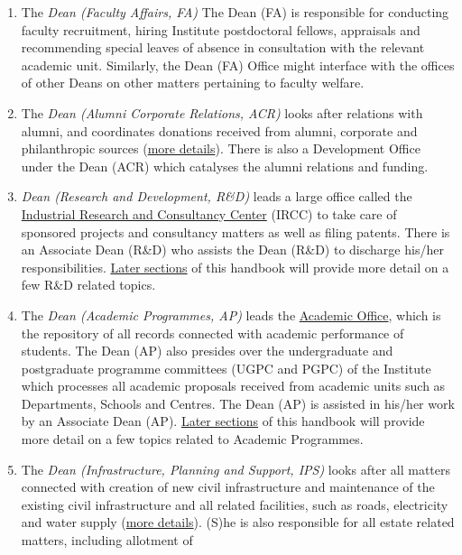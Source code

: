 \documentclass[
  10pt,
  a5paper,
  10pt,
  openany]{amsbook}
\begin{document}
\begin{enumerate}
\def\labelenumi{\arabic{enumi}.}
\item
  The \emph{Dean (Faculty Affairs, FA)} The Dean (FA) is responsible for
  conducting faculty recruitment, hiring Institute postdoctoral fellows,
  appraisals and recommending special leaves of absence in consultation
  with the relevant academic unit. Similarly, the Dean (FA) Office might
  interface with the offices of other Deans on other matters pertaining
  to faculty welfare.
\item
  The \emph{Dean (Alumni Corporate Relations, ACR)} looks after
  relations with alumni, and coordinates donations received from alumni,
  corporate and philanthropic sources
  (\href{https://acr.iitbombay.org/}{more details}). There is also a
  Development Office under the Dean (ACR) which catalyses the alumni
  relations and funding.
\item
  \emph{Dean (Research and Development, R\&D)} leads a large office
  called the \href{https://www.ircc.iitb.ac.in/}{Industrial Research and
  Consultancy Center} (IRCC) to take care of sponsored projects and
  consultancy matters as well as filing patents. There is an Associate
  Dean (R\&D) who assists the Dean (R\&D) to discharge his/her
  responsibilities. \hyperref[sec:researchfunding]{Later sections} of
  this handbook will provide more detail on a few R\&D related topics.
\item
  The \emph{Dean (Academic Programmes, AP)} leads the
  \href{http://www.iitb.ac.in/newacadhome/offdetail.jsp}{Academic
  Office}, which is the repository of all records connected with
  academic performance of students. The Dean (AP) also presides over the
  undergraduate and postgraduate programme committees (UGPC and PGPC) of
  the Institute which processes all academic proposals received from
  academic units such as Departments, Schools and Centres. The Dean (AP)
  is assisted in his/her work by an Associate Dean (AP).
  \hyperref[sec:acadrules]{Later sections} of this handbook will provide
  more detail on a few topics related to Academic Programmes.
\item
  The \emph{Dean (Infrastructure, Planning and Support, IPS)} looks
  after all matters connected with creation of new civil infrastructure
  and maintenance of the existing civil infrastructure and all related
  facilities, such as roads, electricity and water supply
  (\href{https://www.iitb.ac.in/deanpl/}{more details}). (S)he is also
  responsible for all estate related matters, including allotment of

\end{enumerate}
\end{document}
